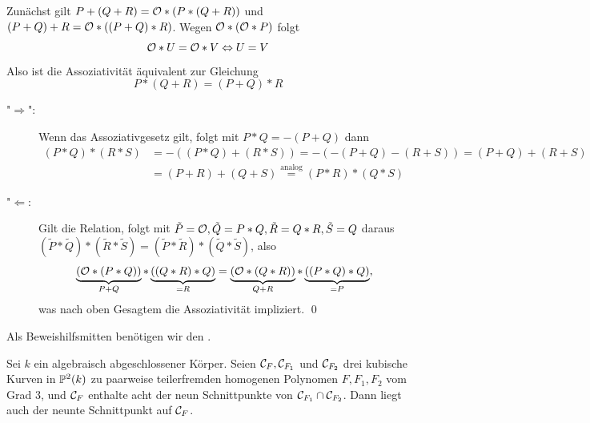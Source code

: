 	Zunächst gilt $P + (Q + R) = \mathcal{O} * (P * (Q+R))$ und $(P+Q)+R = \mathcal{O} * ((P+Q)*R)$. 
	Wegen $\mathcal{O} * (\mathcal{O} * P)$ folgt
	\[ \mathcal{O} * U = \mathcal{O} * V \Leftrightarrow U = V \]
	Also ist die Assoziativität äquivalent zur Gleichung
	\[ P * (Q+R) = (P+Q) * R \]
	\begin{description}
		\item["$\Rightarrow$":] Wenn das Assoziativgesetz gilt, folgt mit $P*Q = -(P+Q)$ dann
		\begin{equation}
		\begin{aligned}
			(P*Q) *(R*S) &= -((P*Q) + (R*S)) = -(-(P+Q)-(R+S)) = (P+Q) + (R+S) \\
			&= (P+R) + (Q+S) \overset{\text{analog}}{=} (P*R)*(Q*S)
		\end{aligned}
		\end{equation}
		\item["$\Leftarrow$:] Gilt die Relation, folgt mit $\tilde{P}=\mathcal{O}, \tilde{Q} = P*Q, \tilde{R} = Q*R, \tilde{S} = Q$ daraus $(\tilde{P}*\tilde{Q})*(\tilde{R}*\tilde{S}) = (\tilde{P} * \tilde{R}) * (\tilde{Q} * \tilde{S})$, also
		\[ \underbrace{(\mathcal{O} * (P*Q))}_{P+Q} * \underbrace{((Q*R) * Q)}_{=R} = \underbrace{(\mathcal{O} * (Q * R))}_{Q+R} * \underbrace{((P*Q) * Q)}_{=P},\]
		was nach oben Gesagtem die Assoziativität impliziert. \qed
	\end{description}
	
Als Beweishilfsmitten benötigen wir den .
\begin{satz}[Neunpunktesatz]
	Sei $k$ ein algebraisch abgeschlossener Körper. 
	Seien $\mathcal{C}_{F},\mathcal{C}_{F_1}$ und $\mathcal{C}_{F_2}$ drei kubische Kurven in $\mathbb{P}^2(k)$ zu paarweise teilerfremden homogenen Polynomen $F,F_1,F_2$ vom Grad $3$, und $\mathcal{C}_F$ enthalte acht der neun Schnittpunkte von $\mathcal{C}_{F_1} \cap \mathcal{C}_{F_2}$. 
	Dann liegt auch der neunte Schnittpunkt auf $\mathcal{C}_F$.
\end{satz}

